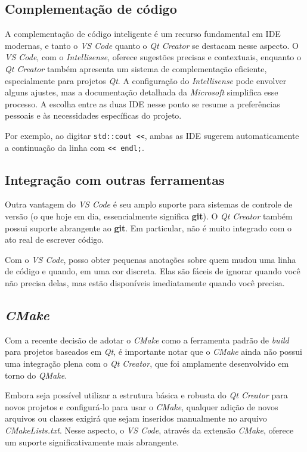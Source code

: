 \documentclass[a4paper,11pt]{article}
\newcommand{\cmake}{\textit{CMake}}
\newcommand{\build}{\textit{build}}
\newcommand{\qtcreator}{\textit{Qt Creator}}
\newcommand{\qt}{\textit{Qt}}
\newcommand{\vscode}{\textit{VS Code}}
\begin{document}
\subsection{Complementação de código}

A complementação de código inteligente é um recurso fundamental em IDE modernas, e tanto o \vscode{} quanto o \qtcreator{} se destacam nesse aspecto. O \vscode{}, com o \textit{Intellisense}, oferece sugestões precisas e contextuais, enquanto o \qtcreator{} também apresenta um sistema de complementação eficiente, especialmente para projetos \qt{}. A configuração do \textit{Intellisense} pode envolver alguns ajustes, mas a documentação detalhada da \textit{Microsoft} simplifica esse processo. A escolha entre as duas IDE nesse ponto se resume a preferências pessoais e às necessidades específicas do projeto.

Por exemplo, ao digitar \lstinline|std::cout <<|, ambas as IDE sugerem automaticamente a continuação da linha com \lstinline|<< endl;|.


\subsection{Integração com outras ferramentas}

Outra vantagem do \vscode{} é seu amplo suporte para sistemas de controle de versão (o que hoje em dia, essencialmente significa \textbf{git}). O \qtcreator{} também possui suporte abrangente ao \textbf{git}. Em particular, não é muito integrado com o ato real de escrever código.

Com o \vscode{}, posso obter pequenas anotações sobre quem mudou uma linha de código e quando, em uma cor discreta. Elas são fáceis de ignorar quando você não precisa delas, mas estão disponíveis imediatamente quando você precisa.

\subsection{\cmake{}}

Com a recente decisão de adotar o \cmake{} como a ferramenta padrão de \build{} para projetos baseados em \qt{}, é importante notar que o \cmake{} ainda não possui uma integração plena com o \qtcreator{}, que foi amplamente desenvolvido em torno do \textit{QMake}.

Embora seja possível utilizar a estrutura básica e robusta do \qtcreator{} para novos projetos e configurá-lo para usar o \cmake{}, qualquer adição de novos arquivos ou classes exigirá que sejam inseridos manualmente no arquivo \textit{CMakeLists.txt}. Nesse aspecto, o \vscode{}, através da extensão \cmake{}, oferece um suporte significativamente mais abrangente.
\end{document}
